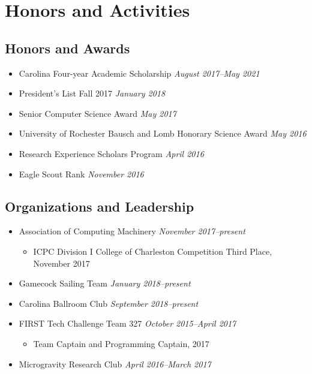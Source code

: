 \documentclass[10pt,letterpaper,roman]{moderncv}
\begin{document}
\section{Honors and Activities}
\subsection{\textbf{Honors and Awards}}
\begin{itemize}
  \item Carolina Four-year Academic Scholarship \hfill \textit{August 2017--May 2021}
  \item President's List Fall 2017 \hfill \textit{January 2018}

  \item Senior Computer Science Award \hfill \textit{May 2017}
  \item University of Rochester Bausch and Lomb Honorary Science Award \hfill \textit{May 2016}
  \item Research Experience Scholars Program \hfill \textit{April 2016}
  \item Eagle Scout Rank \hfill \textit{November 2016}
\end{itemize}

\subsection{\textbf{Organizations and Leadership}}
\begin{itemize}
  \item Association of Computing Machinery \hfill \textit{November 2017--present}
  \begin{itemize}
    \item ICPC Division I College of Charleston Competition Third Place, November 2017
  \end{itemize}
  \item Gamecock Sailing Team \hfill \textit{January 2018--present}
  \item Carolina Ballroom Club \hfill \textit{September 2018--present}

  \item FIRST Tech Challenge Team 327 \hfill \textit{October 2015--April 2017}
  \begin{itemize}
    \item Team Captain and Programming Captain, 2017
  \end{itemize}
  \item Microgravity Research Club \hfill \textit{April 2016--March 2017}
\end{itemize}
\end{document}
